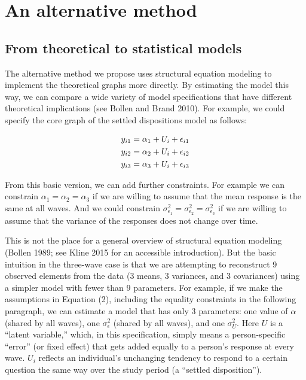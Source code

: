 \documentclass[
  11pt,
]{article}
\begin{document}
\hypertarget{an-alternative-method}{%
\section{An alternative method}\label{an-alternative-method}}

\hypertarget{from-theoretical-to-statistical-models}{%
\subsection{From theoretical to statistical models}\label{from-theoretical-to-statistical-models}}

The alternative method we propose uses structural equation modeling to implement the theoretical graphs more directly. By estimating the model this way, we can compare a wide variety of model specifications that have different theoretical implications (see Bollen and Brand 2010). For example, we could specify the core graph of the settled dispositions model as follows:

\begin{eqnarray}
  y_{i1} = \alpha_1 + U_i + \epsilon_{i1} \\ 
  y_{i2} = \alpha_2 + U_i + \epsilon_{i2} \notag \\
  y_{i3} = \alpha_3 + U_i + \epsilon_{i3} \notag
\end{eqnarray}

From this basic version, we can add further constraints. For example we can constrain \(\alpha_1 = \alpha_2 = \alpha_3\) if we are willing to assume that the mean response is the same at all waves. And we could constrain \(\sigma^2_{\epsilon_1} = \sigma^2_{\epsilon_2} = \sigma^2_{\epsilon_3}\) if we are willing to assume that the variance of the responses does not change over time.

This is not the place for a general overview of structural equation modeling (Bollen 1989; see Kline 2015 for an accessible introduction). But the basic intuition in the three-wave case is that we are attempting to reconstruct 9 observed elements from the data (3 means, 3 variances, and 3 covariances) using a simpler model with fewer than 9 parameters. For example, if we make the assumptions in Equation (2), including the equality constraints in the following paragraph, we can estimate a model that has only 3 parameters: one value of \(\alpha\) (shared by all waves), one \(\sigma^2_{\epsilon}\) (shared by all waves), and one \(\sigma^2_U\). Here \(U\) is a ``latent variable,'' which, in this specification, simply means a person-specific ``error'' (or fixed effect) that gets added equally to a person's response at every wave. \(U_i\) reflects an individual's unchanging tendency to respond to a certain question the same way over the study period (a ``settled disposition'').
\end{document}
